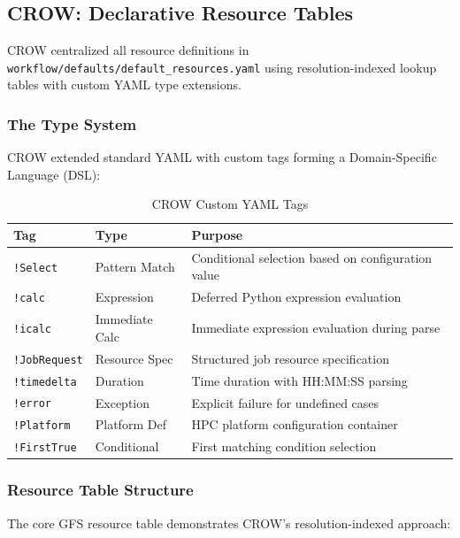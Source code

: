 \documentclass[11pt,twoside]{article}
\newcommand{\crow}{\textsc{CROW}}
\begin{document}
\subsection{CROW: Declarative Resource Tables}
\label{sec:crow-tables}

\crow{} centralized all resource definitions in \texttt{workflow/defaults/default\_resources.yaml} using resolution-indexed lookup tables with custom YAML type extensions.

\subsubsection{The Type System}

\crow{} extended standard YAML with custom tags forming a Domain-Specific Language (DSL):

\begin{table}[H]
\centering
\caption{\crow{} Custom YAML Tags}
\label{tab:crow-tags}
\begin{tabular}{@{}llp{7cm}@{}}
\toprule
\textbf{Tag} & \textbf{Type} & \textbf{Purpose} \\
\midrule
\texttt{!Select} & Pattern Match & Conditional selection based on configuration value \\
\texttt{!calc} & Expression & Deferred Python expression evaluation \\
\texttt{!icalc} & Immediate Calc & Immediate expression evaluation during parse \\
\texttt{!JobRequest} & Resource Spec & Structured job resource specification \\
\texttt{!timedelta} & Duration & Time duration with HH:MM:SS parsing \\
\texttt{!error} & Exception & Explicit failure for undefined cases \\
\texttt{!Platform} & Platform Def & HPC platform configuration container \\
\texttt{!FirstTrue} & Conditional & First matching condition selection \\
\bottomrule
\end{tabular}
\end{table}

\subsubsection{Resource Table Structure}

The core GFS resource table demonstrates \crow{}'s resolution-indexed approach:
\end{document}
